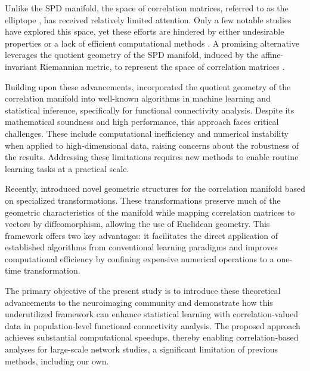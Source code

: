 \documentclass[10pt]{article}
\begin{document}
Unlike the SPD manifold, the space of correlation matrices, referred to as the elliptope \citep{tropp_2018_SimplicialFacesSet}, has received relatively limited attention. Only a few notable studies have explored this space, yet these efforts are hindered by either undesirable properties or a lack of efficient computational methods \citep{grubisic_2007_EfficientRankReduction, nielsen_2019_ClusteringHilbertProjective}. A promising alternative leverages the quotient geometry of the SPD manifold, induced by the affine-invariant Riemannian metric,  to represent the space of correlation matrices \citep{david_2019_RiemannianQuotientStructure, pennec_2006_IntrinsicStatisticsRiemannian, thanwerdas_2021_GeodesicQuotientAffineMetrics}.

Building upon these advancements, \citet{you_2022_GeometricLearningFunctional} incorporated the quotient geometry of the correlation manifold into well-known algorithms in machine learning and statistical inference, specifically for functional connectivity analysis. Despite its mathematical soundness and high performance, this approach faces critical challenges. These include computational inefficiency and numerical instability when applied to high-dimensional data, raising concerns about the robustness of the results. Addressing these limitations requires new methods to enable routine learning tasks at a practical scale.


Recently, \citet{thanwerdas_2022_TheoreticallyComputationallyConvenient} introduced novel geometric structures for the correlation manifold based on specialized transformations. These transformations preserve much of the geometric characteristics of the manifold while mapping correlation matrices to vectors by diffeomorphism, allowing the use of Euclidean geometry. This framework offers two key advantages: it facilitates the direct application of established algorithms from conventional learning paradigms and improves computational efficiency by confining expensive numerical operations to a one-time transformation.


The primary objective of the present study is to introduce these theoretical advancements to the neuroimaging community and demonstrate how this underutilized framework can enhance statistical learning with correlation-valued data in population-level functional connectivity analysis. The proposed approach achieves substantial computational speedups, thereby enabling correlation-based analyses for large-scale network studies, a significant limitation of previous methods, including our own.
\end{document}
